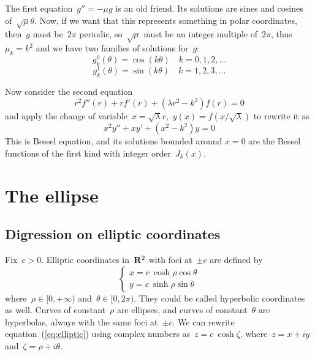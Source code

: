 The first equation~$g''=-\mu g$ is an old friend.  Its solutions are
sines and cosines of~$\sqrt{\mu}\theta$.  Now, if we want that this
represents something in polar coordinates, then~$g$ must be~$2\pi$
periodic, so~$\sqrt{\mu}$ must be an integer multiple of~$2\pi$,
thus~$\mu_k=k^2$ and we have two families of solutions
for~$g$:
\[
	g^0_k(\theta) = \cos(k \theta)
	\quad k=0,1,2,\ldots
\]
\[
	g^1_k(\theta) = \sin(k \theta)
	\quad k=1,2,3,\ldots
\]

Now consider the second equation
\[
	r^2f''(r) + rf'(r)
	+\left(\lambda r^2
		-
	k^2
	\right)f(r) = 0
\]
and apply the change of variable~$x=\sqrt\lambda
r$,~$y(x)=f\left(x/\sqrt\lambda\right)$ to rewrite it as
\[
		x^2y''+xy'+\left(x^2-
	k^2\right)y=0
\]
This is Bessel equation, and its solutions bounded around $x=0$ are
the Bessel functions of the first kind with integer order~$J_k(x)$.

\section{The ellipse}


\subsection{Digression on elliptic coordinates}

Fix~$c>0$.  Elliptic coordinates in~$\mathbf{R}^2$ with foci at~$\pm c$ are
defined by
\begin{equation}\label{eq:elliptic}
	\begin{cases}
		x = c\ \cosh\rho\cos\theta \\
		y = c\ \sinh\rho\sin\theta
	\end{cases}
\end{equation}
where~$\rho\in[0,+\infty)$ and~$\theta\in[0,2\pi)$.
They could be called hyperbolic coordinates as well.
Curves of constant~$\rho$ are ellipses, and curves of
constant~$\theta$ are hyperbolas, always with the same foci at~$\pm
c$.  We can rewrite equation~(\ref{eq:elliptic}) using complex
numbers as~$z=c\ \cosh\zeta$,  where~$z=x+iy$ and~$\zeta=\rho+i\theta$.

